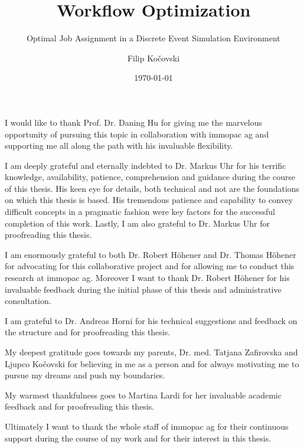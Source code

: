 \documentclass[draft=false]{seal_thesis}
\date{\today}
\title{Workflow Optimization}
\subtitle{Optimal Job Assignment in a Discrete Event Simulation Environment}
\author{Filip Ko\v{c}ovski}
\begin{document}
\maketitle

\frontmatter

\begin{acknowledgements}

I would like to thank Prof. Dr. Daning Hu for giving me the marvelous opportunity of pursuing this topic in collaboration with immopac ag and supporting me all along the path with his invaluable flexibility.

I am deeply grateful and eternally indebted to Dr. Markus Uhr for his terrific knowledge, availability, patience, comprehension and guidance during the course of this thesis. His keen eye for details, both technical and not are the foundations on which this thesis is based. His tremendous patience and capability to convey difficult concepts in a pragmatic fashion were key factors for the successful completion of this work. Lastly, I am also grateful to Dr. Markus Uhr for proofreading this thesis.

I am enormously grateful to both Dr. Robert H\"ohener and Dr. Thomas H\"ohener for advocating for this collaborative project and for allowing me to conduct this research at immopac ag. Moreover I want to thank Dr. Robert H\"ohener for his invaluable feedback during the initial phase of this thesis and administrative consultation.

I am grateful to Dr. Andreas Horni for his technical suggestions and feedback on the \latex structure and for proofreading this thesis.

My deepest gratitude goes towards my parents, Dr. med. Tatjana Zafirovska and Ljupco Ko\v{c}ovski for believing in me as a person and for always motivating me to pursue my dreams and push my boundaries.

My warmest thankfulness goes to Martina Lardi for her invaluable academic feedback and for proofreading this thesis.

Ultimately I want to thank the whole staff of immopac ag for their continuous support during the course of my work and for their interest in this thesis.

\end{acknowledgements}
\end{document}
